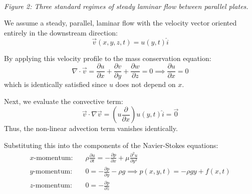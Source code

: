 \begin{center}
\\ \small\textit{Figure 2: Three standard regimes of steady laminar flow between parallel plates.}
\end{center}

We assume a steady, parallel, laminar flow with the velocity vector oriented entirely in the downstream direction:
\begin{equation}
\vec{v}(x, y, z, t) = u(y, t) \hat{i}
\end{equation}

By applying this velocity profile to the mass conservation equation:
\begin{equation}
\nabla \cdot \vec{v} = \frac{\partial u}{\partial x} + \frac{\partial v}{\partial y} + \frac{\partial w}{\partial z} = 0 \implies \frac{\partial u}{\partial x} = 0
\end{equation}
which is identically satisfied since $u$ does not depend on $x$.

Next, we evaluate the convective term:
\begin{equation}
\vec{v} \cdot \nabla \vec{v} = \left( u \frac{\partial}{\partial x} \right) u(y,t) \hat{i} = \vec{0}
\end{equation}
Thus, the non-linear advection term vanishes identically. 

Substituting this into the components of the Navier-Stokes equations:
\begin{align}
x\text{-momentum:} &\quad \rho \frac{\partial u}{\partial t} = -\frac{\partial p}{\partial x} + \mu \frac{\partial^2 u}{\partial y^2} \label{eq:x_mom} \\[0.5em]
y\text{-momentum:} &\quad 0 = -\frac{\partial p}{\partial y} - \rho g \implies p(x, y, t) = -\rho g y + f(x, t) \\[0.5em]
z\text{-momentum:} &\quad 0 = -\frac{\partial p}{\partial z}
\end{align}

